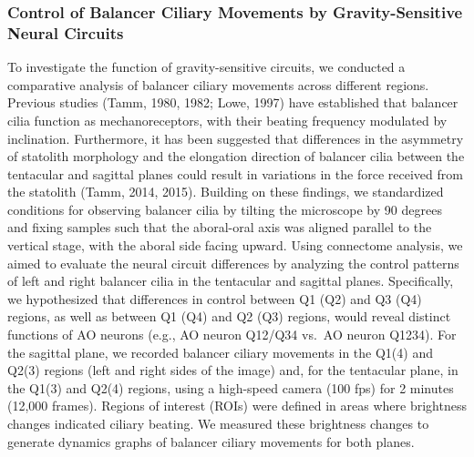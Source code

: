 \documentclass[
  11pt,
]{article}
\begin{document}
\subsubsection{Control of Balancer Ciliary Movements by
Gravity-Sensitive Neural
Circuits}\label{control-of-balancer-ciliary-movements-by-gravity-sensitive-neural-circuits}

To investigate the function of gravity-sensitive circuits, we conducted
a comparative analysis of balancer ciliary movements across different
regions. Previous studies (Tamm, 1980, 1982; Lowe, 1997) have
established that balancer cilia function as mechanoreceptors, with their
beating frequency modulated by inclination. Furthermore, it has been
suggested that differences in the asymmetry of statolith morphology and
the elongation direction of balancer cilia between the tentacular and
sagittal planes could result in variations in the force received from
the statolith (Tamm, 2014, 2015). Building on these findings, we
standardized conditions for observing balancer cilia by tilting the
microscope by 90 degrees and fixing samples such that the aboral-oral
axis was aligned parallel to the vertical stage, with the aboral side
facing upward. Using connectome analysis, we aimed to evaluate the
neural circuit differences by analyzing the control patterns of left and
right balancer cilia in the tentacular and sagittal planes.
Specifically, we hypothesized that differences in control between Q1
(Q2) and Q3 (Q4) regions, as well as between Q1 (Q4) and Q2 (Q3)
regions, would reveal distinct functions of AO neurons (e.g., AO neuron
Q12/Q34 vs.~AO neuron Q1234). For the sagittal plane, we recorded
balancer ciliary movements in the Q1(4) and Q2(3) regions (left and
right sides of the image) and, for the tentacular plane, in the Q1(3)
and Q2(4) regions, using a high-speed camera (100 fps) for 2 minutes
(12,000 frames). Regions of interest (ROIs) were defined in areas where
brightness changes indicated ciliary beating. We measured these
brightness changes to generate dynamics graphs of balancer ciliary
movements for both planes.
\end{document}
